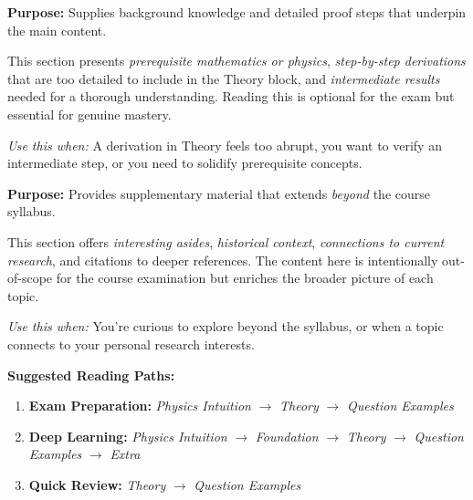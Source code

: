 \bigskip

\noindent
\begin{minipage}{0.9\textwidth}
  \begin{tcolorbox}[breakable, colback=PurpleBG, colframe=AmethystPurple,
                     leftrule=4pt, arc=0pt,
                     before upper={\textcolor{AmethystPurple}{\textbf{\scshape Foundation}}\par\smallskip}]
    \textbf{Purpose:} Supplies background knowledge and detailed proof steps
    that underpin the main content.

    This section presents \emph{prerequisite mathematics or physics},
    \emph{step-by-step derivations} that are too detailed to include in the Theory block,
    and \emph{intermediate results} needed for a thorough understanding.
    Reading this is optional for the exam but essential for genuine mastery.

    \smallskip
    \textit{Use this when:} A derivation in Theory feels too abrupt, you want to verify
    an intermediate step, or you need to solidify prerequisite concepts.
  \end{tcolorbox}
\end{minipage}

\bigskip

\noindent
\begin{minipage}{0.9\textwidth}
  \begin{tcolorbox}[breakable, colback=GrayBG, colframe=SlateGray,
                     leftrule=2pt, rightrule=2pt, arc=3pt,
                     before upper={\textcolor{SlateGray}{\textbf{\scshape Extra}}\par\smallskip}]
    \textbf{Purpose:} Provides supplementary material that extends \emph{beyond}
    the course syllabus.

    This section offers \emph{interesting asides}, \emph{historical context},
    \emph{connections to current research}, and citations to deeper references.
    The content here is intentionally out-of-scope for the course examination
    but enriches the broader picture of each topic.

    \smallskip
    \textit{Use this when:} You're curious to explore beyond the syllabus, or when a topic
    connects to your personal research interests.
  \end{tcolorbox}
\end{minipage}

\bigskip\bigskip

\noindent\textbf{Suggested Reading Paths:}
\begin{enumerate}
  \item \textbf{Exam Preparation:} \textit{Physics Intuition} $\to$
        \textit{Theory} $\to$ \textit{Question Examples}
  \item \textbf{Deep Learning:} \textit{Physics Intuition} $\to$ \textit{Foundation}
        $\to$ \textit{Theory} $\to$ \textit{Question Examples} $\to$ \textit{Extra}
  \item \textbf{Quick Review:} \textit{Theory} $\to$ \textit{Question Examples}
\end{enumerate}

